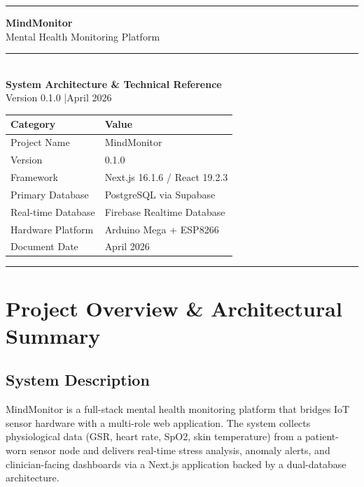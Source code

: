 \documentclass[12pt,a4paper]{report}
\begin{document}
\begin{titlepage}
  \centering
  \vspace*{3cm}
  {\color{accent}\rule{\textwidth}{2pt}}
  \vspace{1cm}

  {\fontsize{28}{34}\selectfont\bfseries\color{accent} MindMonitor}\\[0.4em]
  {\Large\color{codegray} Mental Health Monitoring Platform}\\[0.8em]
  {\color{accentlight}\rule{8cm}{0.6pt}}\\[1em]
  {\large\bfseries System Architecture \& Technical Reference}\\[0.4em]
  {\normalsize Version 0.1.0 \quad|\quad April 2026}

  \vspace{3cm}
  \begin{tabular}{L{4cm} L{8cm}}
    \toprule
    \textbf{Category}     & \textbf{Value} \\
    \midrule
    Project Name          & MindMonitor \\
    Version               & 0.1.0 \\
    Framework             & Next.js 16.1.6 / React 19.2.3 \\
    Primary Database      & PostgreSQL via Supabase \\
    Real-time Database    & Firebase Realtime Database \\
    Hardware Platform     & Arduino Mega + ESP8266 \\
    Document Date         & April 2026 \\
    \bottomrule
  \end{tabular}

  \vfill
  {\color{accent}\rule{\textwidth}{2pt}}
\end{titlepage}

\tableofcontents
\clearpage

\chapter{Project Overview \& Architectural Summary}
\label{ch:overview}

\section{System Description}

MindMonitor is a full-stack mental health monitoring platform that bridges
IoT sensor hardware with a multi-role web application. The system collects
physiological data (GSR, heart rate, SpO2, skin temperature) from a
patient-worn sensor node and delivers real-time stress analysis, anomaly
alerts, and clinician-facing dashboards via a Next.js application backed
by a dual-database architecture.
\end{document}
